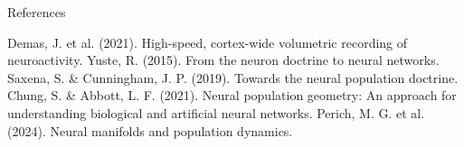 \documentclass[aspectratio=169]{beamer}
\begin{document}
\begin{frame}{References}
    \begin{thebibliography}{10}
         Demas, J. et al. (2021). High-speed, cortex-wide volumetric recording of neuroactivity.
         Yuste, R. (2015). From the neuron doctrine to neural networks.
         Saxena, S. \& Cunningham, J. P. (2019). Towards the neural population doctrine.
         Chung, S. \& Abbott, L. F. (2021). Neural population geometry: An approach for understanding biological and artificial neural networks.
         Perich, M. G. et al. (2024). Neural manifolds and population dynamics.
    \end{thebibliography}
\end{frame}
\end{document}
